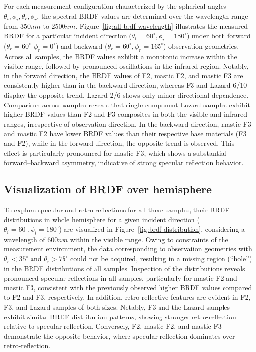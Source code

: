 For each measurement configuration characterized by the spherical angles $\theta_i, \phi_i, \theta_r, \phi_r$, the spectral BRDF values are determined over the wavelength range from $350nm$ to $2500nm$.
Figure~\ref{fig:all-brdf-wavelength} illustrates the measured BRDF for a particular incident direction ($\theta_i=60^\circ, \phi_i=180^\circ$) under both forward ($\theta_r=60^\circ, \phi_r=0^\circ$) and backward ($\theta_r=60^\circ, \phi_r=165^\circ$) observation geometries.
Across all samples, the BRDF values exhibit a monotonic increase within the visible range, followed by pronounced oscillations in the infrared region.
Notably, in the forward direction, the BRDF values of F2, mastic F2, and mastic F3 are consistently higher than in the backward direction, whereas F3 and Lazard 6/10 display the opposite trend. Lazard 2/6 shows only minor directional dependence.
Comparison across samples reveals that single-component Lazard samples exhibit higher BRDF values than F2 and F3 composites in both the visible and infrared ranges, irrespective of observation direction.
In the backward direction, mastic F3 and mastic F2 have lower BRDF values than their respective base materials (F3 and F2), while in the forward direction, the opposite trend is observed. 
This effect is particularly pronounced for mastic F3, which shows a substantial forward–backward asymmetry, indicative of strong specular reflection behavior.


\subsection{Visualization of BRDF over hemisphere}
To explore specular and retro reflections for all these samples, their BRDF distributions in whole hemisphere for a given incident direction ($\theta_i=60^\circ, \phi_i=180^\circ$) are visualized in Figure~\ref{fig:brdf-distribution}, considering a wavelength of $600 nm$ within the visible range.
Owing to constraints of the measurement environment, the data corresponding to observation geometries with $\theta_r <35^\circ$ and $\theta_r >75^\circ$ could not be acquired, resulting in a missing region (“hole”) in the BRDF distributions of all samples.
Inspection of the distributions reveals pronounced specular reflections in all samples, particularly for mastic F2 and mastic F3, consistent with the previously observed higher BRDF values compared to F2 and F3, respectively. 
In addition, retro-reflective features are evident in F2, F3, and Lazard samples of both sizes.
Notably, F3 and the Lazard samples exhibit similar BRDF distribution patterns, showing stronger retro-reflection relative to specular reflection. 
Conversely, F2, mastic F2, and mastic F3 demonstrate the opposite behavior, where specular reflection dominates over retro-reflection.


